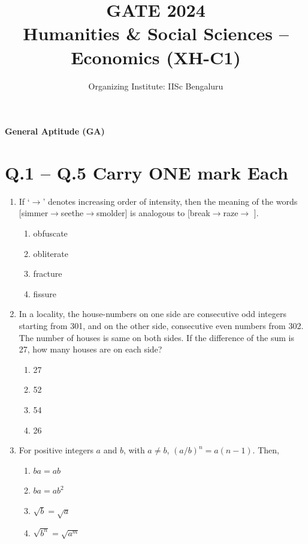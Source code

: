 \documentclass{article}
\title{\textbf{GATE 2024\\Humanities \& Social Sciences – Economics (XH-C1)}}
\author{Organizing Institute: IISc Bengaluru}
\date{}
\begin{document}
\maketitle
\noindent \textbf{General Aptitude (GA)}

\section*{Q.1 – Q.5 Carry ONE mark Each}
\begin{enumerate}[leftmargin=*, label=Q.\arabic*.]
    \item If ‘$\rightarrow$’ denotes increasing order of intensity, then the meaning of the words [simmer$\rightarrow$seethe$\rightarrow$smolder] is analogous to [break$\rightarrow$raze$\rightarrow$ \makebox[1cm]{\hrulefill}].
    
    \begin{multicols}{4}
        \begin{enumerate}
            \item obfuscate
            \item obliterate
            \item fracture
            \item fissure
        \end{enumerate}
    \end{multicols}

    \item In a locality, the house-numbers on one side are consecutive odd integers starting from 301, and on the other side, consecutive even numbers from 302. The number of houses is same on both sides. If the difference of the sum is 27, how many houses are on each side?

    \begin{multicols}{4}
        \begin{enumerate}
            \item 27
            \item 52
            \item 54
            \item 26
        \end{enumerate}
    \end{multicols}
   
    \item For positive integers $a$ and $b$, with $a \neq b$, $(a/b)^n = a(n-1)$. Then,

    \begin{multicols}{4}
        \begin{enumerate}
            \item $ba = ab$
            \item $ba = ab^2$
            \item $\sqrt{b} = \sqrt{a}$
            \item $\sqrt{b^n} = \sqrt{a^m}$
        \end{enumerate}
    \end{multicols}


\end{enumerate}
\end{document}
